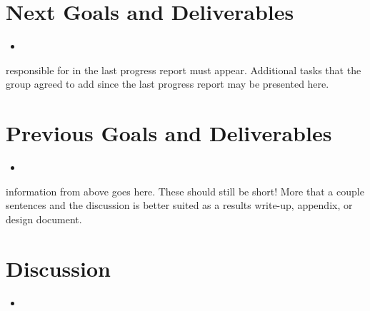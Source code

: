 \documentclass{article}
\begin{document}
\section*{Next Goals and Deliverables}
\begin{itemize}
\item

\end{itemize}

responsible for in the last progress report must appear. Additional tasks that the
group agreed to add since the last progress report may be presented here.
\section*{Previous Goals and Deliverables}
\begin{itemize}
\item 
\end{itemize}

information from above goes here. These should still be short! More that a couple
sentences and the discussion is better suited as a results write-up, appendix, or
design document.
\section*{Discussion}
\begin{itemize}
\item 
\end{itemize}

\end{document}
